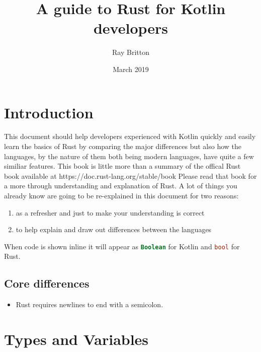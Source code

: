 \documentclass[a4paper,11pt]{article}
\begin{document}
\lstset{basicstyle=\ttfamily\footnotesize,breaklines=true}
\lstset{language=Rust, style=colouredRust}

\title{A guide to Rust for Kotlin developers}
\author{Ray Britton}
\date{March 2019}

\maketitle

\newpage
{}
\tableofcontents

\newpage
{}
\section{Introduction}

This document should help developers experienced with Kotlin quickly and easily learn the basics of Rust by comparing the major differences but also how the languages, by the nature of them both being modern languages, have quite a few similiar features.
\newline
This book is little more than a summary of the offical Rust book available at https://doc.rust-lang.org/stable/book
Please read that book for a more through understanding and explanation of Rust.
\newline
\newline
A lot of things you already know are going to be re-explained in this document for two reasons:
\begin{enumerate}
	\item as a refresher and just to make your understanding is correct
	\item to help explain and draw out differences between the languages
\end{enumerate}
When code is shown inline it will appear as \lstinline[language=Kotlin]{Boolean} for Kotlin and \lstinline[language=Rust]{bool} for Rust.

\subsection{Core differences}
\begin{itemize}
	\item Rust requires newlines to end with a semicolon.
\end{itemize}

\newpage
\section{Types and Variables}
\end{document}
